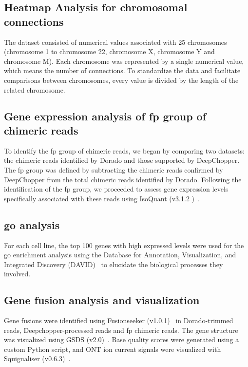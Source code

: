 \documentclass[pdflatex,sn-nature, lineno]{sn-jnl}%
\theoremstyle{thmstyleone}%
\theoremstyle{thmstyletwo}%
\theoremstyle{thmstylethree}%
\begin{document}
\subsection{Heatmap Analysis for chromosomal connections}

The dataset consisted of numerical values associated with 25 chromosomes (chromosome 1 to chromosome 22, chromosome X, chromosome Y and chromosome M).
Each chromosome was represented by a single numerical value, which means the number of connections.
To standardize the data and facilitate comparisons between chromosomes, every value is divided by the length of the related chromosome.

\subsection{Gene expression analysis of \gls{fp} group of chimeric reads}

To identify the \gls{fp} group of chimeric reads, we began by comparing two datasets: the chimeric reads identified by Dorado and those supported by DeepChopper.
The \gls{fp} group was defined by subtracting the chimeric reads confirmed by DeepChopper from the total chimeric reads identified by Dorado.
Following the identification of the \gls{fp} group, we proceeded to assess gene expression levels specifically associated with these reads using IsoQuant (v3.1.2 )~\cite{prjibelski2023accurate}.


\subsection{\gls{go} analysis}

For each cell line, the top 100 genes with high expressed levels were used for the \gls{go} enrichment analysis using the Database for Annotation, Visualization, and Integrated Discovery (DAVID)~\cite{sherman2022david} to elucidate the biological processes they involved.

\subsection{Gene fusion analysis and visualization}

Gene fusions were identified using Fusionseeker (v1.0.1)~\cite{chen2023gene} in Dorado-trimmed reads, Deepchopper-processed reads and \gls{fp} chimeric reads.
The gene structure was visualized using GSDS (v2.0)~\cite{hu2015gsds}.
Base quality scores were generated using a custom Python script, and ONT ion current signals were visualized with Squigualiser (v0.6.3)~\cite{samarakoon2024interactive}.
\end{document}
